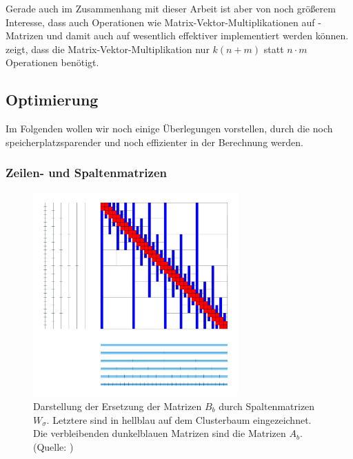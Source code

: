    Gerade auch im Zusammenhang mit dieser Arbeit ist aber von noch größerem Interesse, dass auch Operationen wie Matrix-Vektor-Multiplikationen auf \Rk-Matrizen und damit auch auf \hmat wesentlich 
    effektiver implementiert werden können. \citet{h2diss} zeigt, dass die Matrix-Vektor-Multiplikation nur $k\left(n+m\right)$ statt $n \cdot m$ Operationen benötigt.
    
    
    \subsection{Optimierung}
    \label{sec:optimierung}
    Im Folgenden wollen wir noch einige Überlegungen vorstellen, durch die \hmat noch speicherplatzsparender und noch effizienter in der Berechnung werden.
    
    \subsubsection{Zeilen- und Spaltenmatrizen}
    
    \begin{figure}[b]
      \includegraphics[width=0.7\textwidth]{img/semi-h2-matrix.png}
      \caption{Darstellung der Ersetzung der Matrizen $B_b$ durch Spaltenmatrizen $W_\sigma$. Letztere sind in hellblau auf dem Clusterbaum eingezeichnet. Die verbleibenden dunkelblauen 
	       Matrizen sind die Matrizen $A_b$. (Quelle: \citet{h2slides})}
      \label{fig:semi-h2}
    \end{figure}
    
